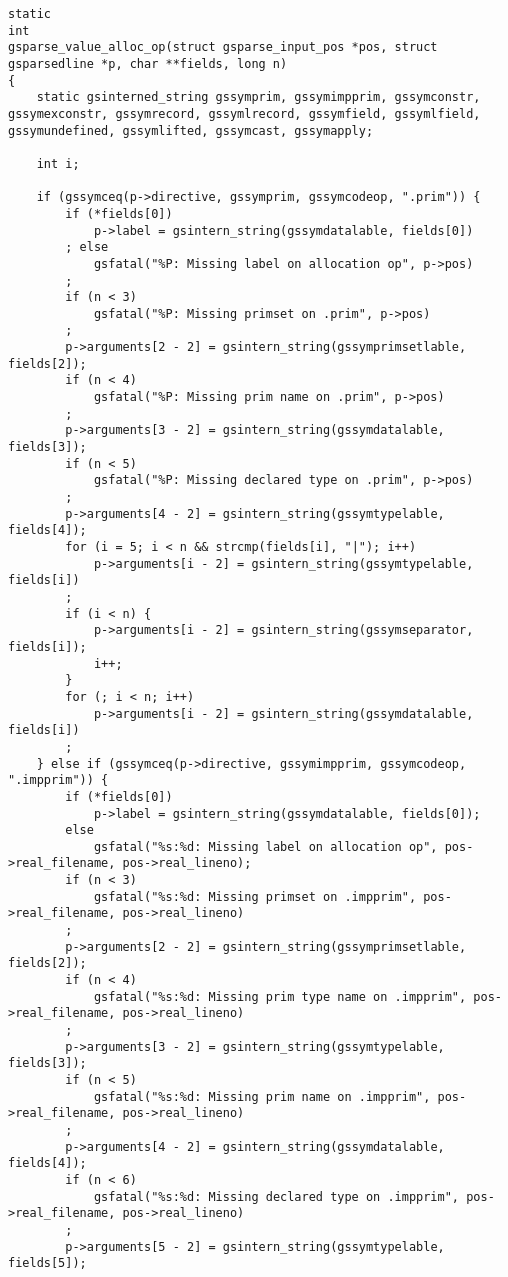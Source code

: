 \documentclass{report}
\begin{document}
\begin{verbatim}
static
int
gsparse_value_alloc_op(struct gsparse_input_pos *pos, struct gsparsedline *p, char **fields, long n)
{
    static gsinterned_string gssymprim, gssymimpprim, gssymconstr, gssymexconstr, gssymrecord, gssymlrecord, gssymfield, gssymlfield, gssymundefined, gssymlifted, gssymcast, gssymapply;

    int i;

    if (gssymceq(p->directive, gssymprim, gssymcodeop, ".prim")) {
        if (*fields[0])
            p->label = gsintern_string(gssymdatalable, fields[0])
        ; else
            gsfatal("%P: Missing label on allocation op", p->pos)
        ;
        if (n < 3)
            gsfatal("%P: Missing primset on .prim", p->pos)
        ;
        p->arguments[2 - 2] = gsintern_string(gssymprimsetlable, fields[2]);
        if (n < 4)
            gsfatal("%P: Missing prim name on .prim", p->pos)
        ;
        p->arguments[3 - 2] = gsintern_string(gssymdatalable, fields[3]);
        if (n < 5)
            gsfatal("%P: Missing declared type on .prim", p->pos)
        ;
        p->arguments[4 - 2] = gsintern_string(gssymtypelable, fields[4]);
        for (i = 5; i < n && strcmp(fields[i], "|"); i++)
            p->arguments[i - 2] = gsintern_string(gssymtypelable, fields[i])
        ;
        if (i < n) {
            p->arguments[i - 2] = gsintern_string(gssymseparator, fields[i]);
            i++;
        }
        for (; i < n; i++)
            p->arguments[i - 2] = gsintern_string(gssymdatalable, fields[i])
        ;
    } else if (gssymceq(p->directive, gssymimpprim, gssymcodeop, ".impprim")) {
        if (*fields[0])
            p->label = gsintern_string(gssymdatalable, fields[0]);
        else
            gsfatal("%s:%d: Missing label on allocation op", pos->real_filename, pos->real_lineno);
        if (n < 3)
            gsfatal("%s:%d: Missing primset on .impprim", pos->real_filename, pos->real_lineno)
        ;
        p->arguments[2 - 2] = gsintern_string(gssymprimsetlable, fields[2]);
        if (n < 4)
            gsfatal("%s:%d: Missing prim type name on .impprim", pos->real_filename, pos->real_lineno)
        ;
        p->arguments[3 - 2] = gsintern_string(gssymtypelable, fields[3]);
        if (n < 5)
            gsfatal("%s:%d: Missing prim name on .impprim", pos->real_filename, pos->real_lineno)
        ;
        p->arguments[4 - 2] = gsintern_string(gssymdatalable, fields[4]);
        if (n < 6)
            gsfatal("%s:%d: Missing declared type on .impprim", pos->real_filename, pos->real_lineno)
        ;
        p->arguments[5 - 2] = gsintern_string(gssymtypelable, fields[5]);

\end{verbatim}
\end{document}
